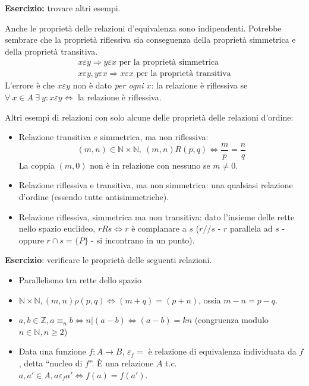 \textbf{Esercizio:} trovare altri esempi.

\vspace{5cm}

Anche le propriet\`a delle relazioni d'equivalenza sono indipendenti. Potrebbe sembrare che la propriet\`a riflessiva sia conseguenza della propriet\`a simmetrica e della propriet\`a transitiva.
\begin{gather*}
x \varepsilon y \Rightarrow y \varepsilon x \text{ per la propriet\`a simmetrica} \\
x \varepsilon y , y \varepsilon x \Rightarrow x \varepsilon x \text{ per la propriet\`a transitiva}
\end{gather*}
L'errore \`e che $x \varepsilon y$ non \`e dato \textit{per ogni $x$}: la relazione \`e riflessiva se $\forall \ x \in A \ \exists \ y : x \varepsilon y \Leftrightarrow $ la relazione \`e riflessiva.

Altri esempi di relazioni con solo alcune delle propriet\`a delle relazioni d'ordine:
\begin{itemize}
  \item Relazione transitiva e simmetrica, ma non riflessiva:
  \[
  (m, n) \in \mathbb{N} \times \mathbb{N}, \ (m,n) R (p, q) \Leftrightarrow \frac{m}{p} = \frac{n}{q}
  \]
  La coppia $(m,0)$ non \`e in relazione con nessuno se $m \neq 0$.
  \item Relazione riflessiva e transitiva, ma non simmetrica: una qualsiasi relazione d'ordine (essendo tutte antisimmetriche).
  \item Relazione riflessiva, simmetrica ma non transitiva: dato l'insieme delle rette nello spazio euclideo, $r R s \Leftrightarrow r $ \`e complanare a $s$ ($r // s$ - $r$ parallela ad $s$ - oppure $r \cap s = \{ P \}$ - si incontrano in un punto).
\end{itemize}

\textbf{Esercizio}: verificare le propriet\`a delle seguenti relazioni.
\begin{itemize}
  \item Parallelismo tra rette dello spazio \vspace{3cm}
  \item $\mathbb{N} \times \mathbb{N}, (m, n) \rho (p, q) \Leftrightarrow (m + q) = (p + n)$, ossia $m - n = p - q$. \vspace{3cm}
  \item $a, b \in \mathbb{Z}, a \equiv_n b \Leftrightarrow n | (a - b) \Leftrightarrow (a-b) = k n$ (congruenza modulo $n \in \mathbb{N}, n \ge 2$) \vspace{3cm}
  \item Data una funzione $f: A \to B $, $ \varepsilon_f = $ \`e relazione di equivalenza individuata da $f$, detta ``nucleo di $f$''. \`E una relazione $A$ t.c. $a, a' \in A, a \varepsilon_f a' \Leftrightarrow f(a) = f(a')$. \vspace{3cm}
\end{itemize}

